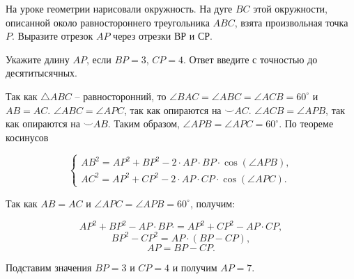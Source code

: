 
На уроке геометрии нарисовали окружность. На дуге $BC$ этой окружности, описанной около равностороннего треугольника $ABC$, 
взята произвольная точка $P$. Выразите отрезок $AP$ через отрезки $ВР$ и $СР$. 

Укажите длину $AP$, если $BP = 3$, $CP = 4$. Ответ введите с точностью до десятитысячных.

\solutionSection

Так как $\triangle ABC$ -- равносторонний, то $\angle BAC = \angle ABC = 
\angle ACB = 60^{\circ}$ и \linebreak $AB=AC$. $\angle ABC = \angle APC$, так как опираются на $\smile AC$. $\angle ACB = \angle APB$, так как опираются на $\smile{AB}$. Таким образом, $\angle APB = \angle APC = 60^{\circ}$. По теореме косинусов 

\begin{equation*} 
    \begin{cases}
    AB^2 = AP^2 + BP^2 - 2 \cdot AP\cdot BP\cdot \cos(\angle APB),\\
    AC^2 = AP^2 + CP^2 - 2 \cdot AP\cdot CP\cdot \cos(\angle APC).
    \end{cases}
\end{equation*}


Так как $AB = AC$ и $\angle APC = \angle APB = 60^{\circ}$, получим:

$$AP^2 + BP^2 - AP\cdot BP\cdot = AP^2 + CP^2 - AP\cdot CP,$$
$$BP^2 - CP^2 = AP\cdot (BP - CP),$$
$$AP = BP - CP.$$

Подставим значения $BP = 3$ и $CP = 4$ и получим $AP = 7$.

